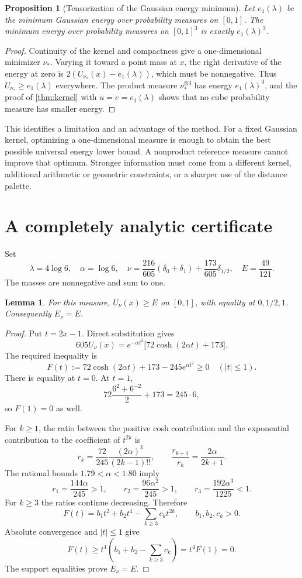 \documentclass[11pt,letterpaper]{article}
\newtheorem{proposition}[theorem]{Proposition}
\newtheorem{lemma}[theorem]{Lemma}
\theoremstyle{definition}
\begin{document}
\begin{proposition}[Tensorization of the Gaussian energy minimum]
\label{prop:tensorization}
Let \(e_1(\lambda)\) be the minimum Gaussian energy over probability
measures on \([0,1]\). The minimum energy over probability measures
on \([0,1]^3\) is exactly \(e_1(\lambda)^3\).
\end{proposition}
\begin{proof}
Continuity of the kernel and compactness give a one-dimensional
minimizer \(\nu_*\). Varying it toward a point mass at \(x\), the
right derivative of the energy at zero is
\(2(U_{\nu_*}(x)-e_1(\lambda))\), which must be nonnegative.
Thus \(U_{\nu_*}\ge e_1(\lambda)\) everywhere. The product measure
\(\nu_*^{\otimes3}\) has energy \(e_1(\lambda)^3\), and the proof of
\cref{thm:kernel} with \(u=e=e_1(\lambda)\) shows that no cube
probability measure has smaller energy.
\end{proof}

This identifies a limitation and an advantage of the method. For a
fixed Gaussian kernel, optimizing a one-dimensional measure is enough
to obtain the best possible universal energy lower bound. A
nonproduct reference measure cannot improve that optimum. Stronger
information must come from a different kernel, additional arithmetic
or geometric constraints, or a sharper use of the distance palette.

\section{A completely analytic certificate}
\label{sec:analytic-certificate}
Set
\[
 \lambda=4\log6,\quad \alpha=\log6,\quad
 \nu=\frac{216}{605}(\delta_0+\delta_1)
       +\frac{173}{605}\delta_{1/2},\quad
 E=\frac{49}{121}.
\]
The masses are nonnegative and sum to one.

\begin{lemma}
\label{lem:analytic-potential}
For this measure, \(U_\nu(x)\ge E\) on \([0,1]\), with equality at
\(0,1/2,1\). Consequently \(E_\nu=E\).
\end{lemma}
\begin{proof}
Put \(t=2x-1\). Direct substitution gives
\[
 605U_\nu(x)=e^{-\alpha t^2}
 \bigl[72\cosh(2\alpha t)+173\bigr].
\]
The required inequality is
\[
 F(t):=72\cosh(2\alpha t)+173-245e^{\alpha t^2}\ge0
 \quad(|t|\le1).
\]
There is equality at \(t=0\). At \(t=1\),
\[
 72\frac{6^2+6^{-2}}2+173=245\cdot6,
\]
so \(F(1)=0\) as well.

For \(k\ge1\), the ratio between the positive cosh contribution and
the exponential contribution to the coefficient of \(t^{2k}\) is
\[
 r_k=\frac{72}{245}\frac{(2\alpha)^k}{(2k-1)!!},
 \qquad \frac{r_{k+1}}{r_k}=\frac{2\alpha}{2k+1}.
\]
The rational bounds \(1.79<\alpha<1.80\) imply
\[
 r_1=\frac{144\alpha}{245}>1,\qquad
 r_2=\frac{96\alpha^2}{245}>1,\qquad
 r_3=\frac{192\alpha^3}{1225}<1.
\]
For \(k\ge3\) the ratios continue decreasing. Therefore
\[
 F(t)=b_1t^2+b_2t^4-\sum_{k\ge3}c_kt^{2k},
 \qquad b_1,b_2,c_k>0.
\]
Absolute convergence and \(|t|\le1\) give
\[
 F(t)\ge t^4\left(b_1+b_2-\sum_{k\ge3}c_k\right)
 =t^4F(1)=0.
\]
The support equalities prove \(E_\nu=E\).
\end{proof}
\end{document}
